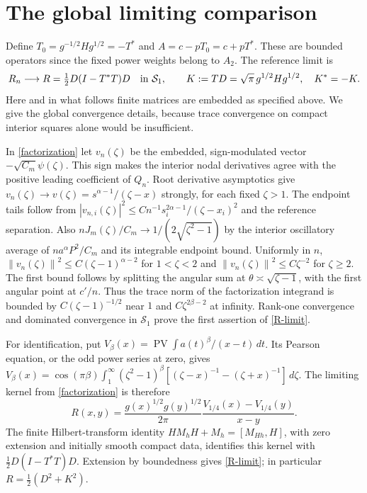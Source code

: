 \documentclass[a4paper,11pt]{amsart}
\theoremstyle{remark}\newtheorem{remark}[theorem]{Remark}
\newcommand{\PV}{\operatorname{PV}}
\newcommand{\dd}{\,d}
\newcommand{\norm}[1]{\left\lVert#1\right\rVert}
\begin{document}
\section{The global limiting comparison}

Define $T_0=g^{-1/2}Hg^{1/2}=-T^*$ and
$A=c-pT_0=c+pT^*$. These are bounded operators since the fixed
power weights belong to $A_2$. The reference limit is
\begin{equation}\label{R-limit}
 R_n\longrightarrow R=\tfrac12D(I-T^*T)D
 \quad\hbox{in }\mathcal S_1,
 \qquad K:=TD=\sqrt\pi\,g^{1/2}Hg^{1/2},\quad K^*=-K.
\end{equation}
Here and in what follows finite matrices are embedded as specified
above. We give the global convergence details, because trace
convergence on compact interior squares alone would be insufficient.

In \eqref{factorization} let $v_n(\zeta)$ be the embedded, sign-modulated
vector $-\sqrt{C_m}\psi(\zeta)$. This sign makes the interior nodal
derivatives agree with the positive leading coefficient of $Q_n$.
Root derivative asymptotics give
$v_n(\zeta)\to v(\zeta)=s^{\alpha-1}/(\zeta-x)$ strongly, for each fixed $\zeta>1$.
The endpoint tails follow from
$|v_{n,i}(\zeta)|^2\le Cn^{-1}s_i^{2\alpha-1}/(\zeta-x_i)^2$ and the
reference separation. Also
$nJ_m(\zeta)/C_m\to1/(2\sqrt{\zeta^2-1})$ by the interior oscillatory
average of $na^\alpha P^2/C_m$ and its integrable endpoint bound.
Uniformly in $n$,
$\norm{v_n(\zeta)}^2\le C(\zeta-1)^{\alpha-2}$ for $1<\zeta<2$ and
$\norm{v_n(\zeta)}^2\le C\zeta^{-2}$ for $\zeta\ge2$.
The first bound follows by splitting the angular sum at
$\theta\asymp\sqrt{\zeta-1}$, with the first angular point at $c'/n$.
Thus the trace norm of the factorization integrand is bounded by
$C(\zeta-1)^{-1/2}$ near $1$ and $C\zeta^{2\beta-2}$ at infinity.
Rank-one convergence and dominated convergence in $\mathcal S_1$
prove the first assertion of \eqref{R-limit}.

For identification, put $V_\beta(x)=\PV\int a(t)^\beta/(x-t)\dd t$.
Its Pearson equation, or the odd power series at zero, gives
$V_\beta(x)=\cos(\pi\beta)\int_1^\infty(\zeta^2-1)^\beta
 [(\zeta-x)^{-1}-(\zeta+x)^{-1}]\dd \zeta$.
The limiting kernel from \eqref{factorization} is therefore
\begin{equation}\label{R-kernel}
 R(x,y)=\frac{g(x)^{1/2}g(y)^{1/2}}{2\pi}
 \frac{V_{1/4}(x)-V_{1/4}(y)}{x-y}.
\end{equation}
The finite Hilbert-transform identity
$HM_hH+M_h=[M_{Hh},H]$, with zero extension and initially smooth
compact data, identifies this kernel with
$\tfrac12D(I-T^*T)D$. Extension by boundedness gives
\eqref{R-limit}; in particular $R=\tfrac12(D^2+K^2)$.
\end{document}
